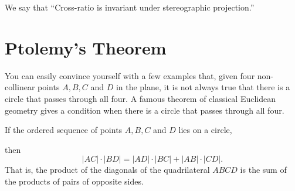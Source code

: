 \documentclass{ximera}
\begin{document}
We say that ``Cross-ratio is invariant under stereographic
projection.''







\section*{Ptolemy's Theorem}

You can easily convince yourself with a few examples that, given four
non-collinear points $A,B,C$ and $D$ in the plane, it is not always
true that there is a circle that passes through all four. A famous
theorem of classical Euclidean geometry gives a condition when there
is a circle that passes through all four.

\begin{theorem}[Ptolemy] If the ordered sequence of points $A,B,C$ and $D$ lies on a circle,
\begin{image}
\end{image}
then%
\[
\left\vert AC\right\vert \cdot\left\vert BD\right\vert
=\left\vert AD\right\vert \cdot\left\vert BC\right\vert
+\left\vert AB\right\vert \cdot\left\vert CD\right\vert
.
\]
That is, the product of the diagonals of the quadrilateral $ABCD$ is the sum
of the products of pairs of opposite sides.
\end{theorem}
\end{document}
